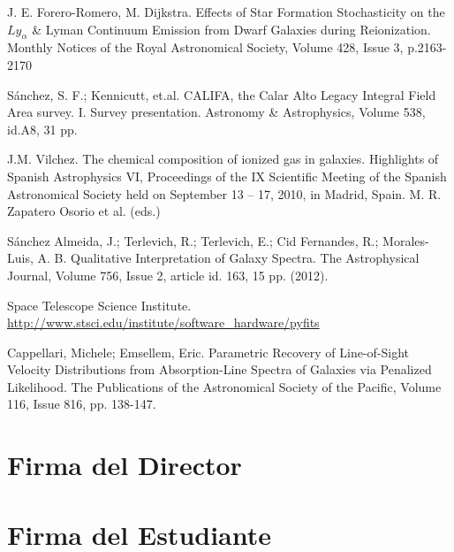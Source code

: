 \documentclass[12pt]{article}
\begin{document}
\begin{thebibliography}{10}

 J. E. Forero-Romero, M. Dijkstra. Effects of Star Formation Stochasticity on the $Ly_{\alpha}$ \&
Lyman Continuum Emission from Dwarf Galaxies during
Reionization. Monthly Notices of the Royal Astronomical Society, Volume 428, Issue 3, p.2163-2170

 S\'anchez, S. F.; Kennicutt, et.al. CALIFA, the Calar Alto Legacy Integral Field Area survey. I. Survey presentation. Astronomy \& Astrophysics, Volume 538, id.A8, 31 pp.


 J.M. Vilchez. The chemical composition of ionized gas in galaxies. Highlights of Spanish Astrophysics VI, Proceedings of the IX Scientific Meeting of the Spanish Astronomical Society held on September 13 -- 17, 2010, in Madrid, Spain. M. R. Zapatero Osorio et al. (eds.)

 S\'anchez Almeida, J.; Terlevich, R.; Terlevich, E.; Cid Fernandes, R.; Morales-Luis, A. B. Qualitative Interpretation of Galaxy Spectra. The Astrophysical Journal, Volume 756, Issue 2, article id. 163, 15 pp. (2012).

 Space Telescope Science Institute. \url{http://www.stsci.edu/institute/software_hardware/pyfits}

 Cappellari, Michele; Emsellem, Eric. Parametric Recovery of Line-of-Sight Velocity Distributions from Absorption-Line Spectra of Galaxies via Penalized Likelihood. The Publications of the Astronomical Society of the Pacific, Volume 116, Issue 816, pp. 138-147.

\end{thebibliography}

\section*{Firma del Director}
\vspace{1.5cm}

\section*{Firma del Estudiante	}
\end{document}
